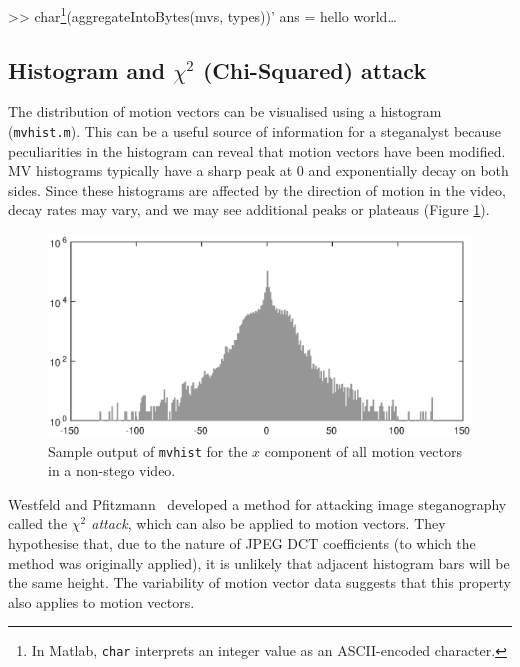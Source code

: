 \documentclass[12pt,british,twoside,notitlepage,usenames,dvipsnames,hypens,final]{report}
\numberwithin{equation}{section}
\numberwithin{figure}{section}
\renewenvironment{alltt}{\vspace{-0.6\baselineskip}\begin{oldalltt}}{\end{oldalltt}\vspace{-0.1\baselineskip}}
\begin{document}
\begin{alltt}
    >> char\footnote{In Matlab, \texttt{char} interprets an integer value as an ASCII-encoded character.}(aggregateIntoBytes(mvs, types))'
    ans = hello world\ldots
\end{alltt}

\subsection{Histogram and $\chi^2$ (Chi-Squared) attack}
\label{hist-chisq-attack}

The distribution of motion vectors can be visualised using a histogram (\texttt{mvhist.m}). This can be a useful source of information for a steganalyst because peculiarities in the histogram can reveal that motion vectors have been modified. MV histograms typically have a sharp peak at 0 and exponentially decay on both sides. Since these histograms are affected by the direction of motion in the video, decay rates may vary, and we may see additional peaks or plateaus (Figure \ref{fig:histogram-example}).

\begin{figure}[tbh]
\centerline{\includegraphics[scale=0.75]{img/histogram-example.eps}}
\caption{Sample output of \texttt{mvhist} for the $x$ component of all motion vectors in a non-stego video.}
\label{fig:histogram-example}
\end{figure}

Westfeld and Pfitzmann~\cite{westfeld1999attacks} developed a method for attacking image steganography called the \emph{$\chi^2$ attack}, which can also be applied to motion vectors. They hypothesise that, due to the nature of JPEG DCT coefficients (to which the method was originally applied), it is unlikely that adjacent histogram bars will be the same height. The variability of motion vector data suggests that this property also applies to motion vectors.
\end{document}
